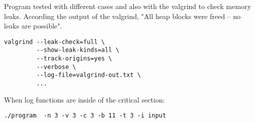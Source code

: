 \documentclass[a4paper]{article}
\begin{document}
Program tested with different cases and also with the valgrind to check memory leaks. According the output of the valgrind, "All heap blocks were freed -- no leaks are possible".

\begin{verbatim}
valgrind --leak-check=full \
         --show-leak-kinds=all \
         --track-origins=yes \
         --verbose \
         --log-file=valgrind-out.txt \
         ...
\end{verbatim}

\newpage

When log functions are inside of the critical section:

\begin{verbatim}
./program  -n 3 -v 3 -c 3 -b 11 -t 3 -i input
\end{verbatim}
\end{document}

